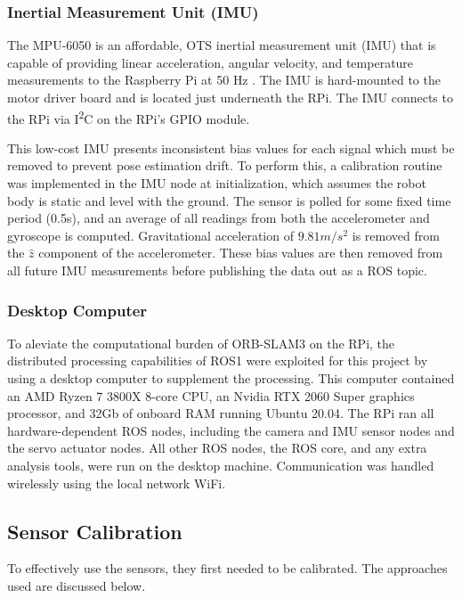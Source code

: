 \subsubsection{ Inertial Measurement Unit (IMU)}
The MPU-6050 is an affordable, OTS inertial measurement unit (IMU) that is capable of providing linear acceleration, angular velocity, and temperature measurements to the Raspberry Pi at 50 Hz \cite{mpu6050}.  The IMU is hard-mounted to the motor driver board and is located just underneath the RPi. The IMU connects to the RPi via I\textsuperscript{2}C on the RPi's GPIO module.

This low-cost IMU presents inconsistent bias values for each signal which must be removed to prevent pose estimation drift. To perform this, a calibration routine was implemented in the IMU node at initialization, which assumes the robot body is static and level with the ground. The sensor is polled for some fixed time period (0.5s), and an average of all readings from both the accelerometer and gyroscope is computed. Gravitational acceleration of $9.81 m/s^2$ is removed from the $\hat{z}$ component of the accelerometer. These bias values are then removed from all future IMU measurements before publishing the data out as a ROS topic.

\subsubsection{ Desktop Computer }
To aleviate the computational burden of ORB-SLAM3 on the RPi, the distributed processing capabilities of ROS1 were exploited for this project by using a desktop computer to supplement the processing. This computer contained an AMD Ryzen 7 3800X 8-core CPU, an Nvidia RTX 2060 Super graphics processor, and 32Gb of onboard RAM running Ubuntu 20.04. The RPi ran all hardware-dependent ROS nodes, including the camera and IMU sensor nodes and the servo actuator nodes. All other ROS nodes, the ROS core, and any extra analysis tools, were run on the desktop machine. Communication was handled wirelessly using the local network WiFi.

\subsection{ Sensor Calibration }
To effectively use the sensors, they first needed to be calibrated. The approaches used are discussed below.


